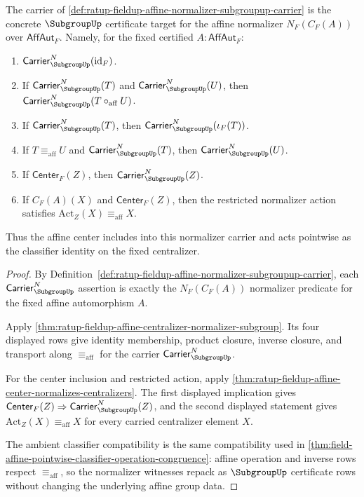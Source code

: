 \begin{theorem}
\label{thm:ratup-fieldup-affine-normalizer-subgroupup-inclusion-action}
The carrier of
\autoref{def:ratup-fieldup-affine-normalizer-subgroupup-carrier} is the
concrete $\SubgroupUp$ certificate target for the affine normalizer
$N_F(C_F(A))$ over $\mathsf{AffAut}_F$. Namely, for the fixed certified
$A:\mathsf{AffAut}_F$:
\begin{enumerate}
\item $\mathsf{Carrier}^{N}_{\SubgroupUp}(\mathrm{id}_F)$.
\item If $\mathsf{Carrier}^{N}_{\SubgroupUp}(T)$ and
$\mathsf{Carrier}^{N}_{\SubgroupUp}(U)$, then
$\mathsf{Carrier}^{N}_{\SubgroupUp}(T\circ_{\mathrm{aff}}U)$.
\item If $\mathsf{Carrier}^{N}_{\SubgroupUp}(T)$, then
$\mathsf{Carrier}^{N}_{\SubgroupUp}(\iota_F(T))$.
\item If $T\equiv_{\mathrm{aff}}U$ and
$\mathsf{Carrier}^{N}_{\SubgroupUp}(T)$, then
$\mathsf{Carrier}^{N}_{\SubgroupUp}(U)$.
\item If $\mathsf{Center}_F(Z)$, then
$\mathsf{Carrier}^{N}_{\SubgroupUp}(Z)$.
\item If $C_F(A)(X)$ and $\mathsf{Center}_F(Z)$, then the restricted
normalizer action satisfies
$\mathrm{Act}_Z(X)\equiv_{\mathrm{aff}}X$.
\end{enumerate}
Thus the affine center includes into this normalizer carrier and acts
pointwise as the classifier identity on the fixed centralizer.
\end{theorem}
\begin{proof}
By Definition~\ref{def:ratup-fieldup-affine-normalizer-subgroupup-carrier},
each $\mathsf{Carrier}^{N}_{\SubgroupUp}$ assertion is exactly the
$N_F(C_F(A))$ normalizer predicate for the fixed affine automorphism $A$.

Apply
\autoref{thm:ratup-fieldup-affine-centralizer-normalizer-subgroup}. Its four
displayed rows give identity membership, product closure, inverse closure, and
transport along $\equiv_{\mathrm{aff}}$ for the carrier
$\mathsf{Carrier}^{N}_{\SubgroupUp}$.

For the center inclusion and restricted action, apply
\autoref{thm:ratup-fieldup-affine-center-normalizes-centralizers}. The first
displayed implication gives
$\mathsf{Center}_F(Z)\Rightarrow\mathsf{Carrier}^{N}_{\SubgroupUp}(Z)$, and
the second displayed statement gives
$\mathrm{Act}_Z(X)\equiv_{\mathrm{aff}}X$ for every carried centralizer element
$X$.

The ambient classifier compatibility is the same compatibility used in
\autoref{thm:field-affine-pointwise-classifier-operation-congruence}: affine
operation and inverse rows respect $\equiv_{\mathrm{aff}}$, so the normalizer
witnesses repack as $\SubgroupUp$ certificate rows without changing the
underlying affine group data.
\end{proof}


